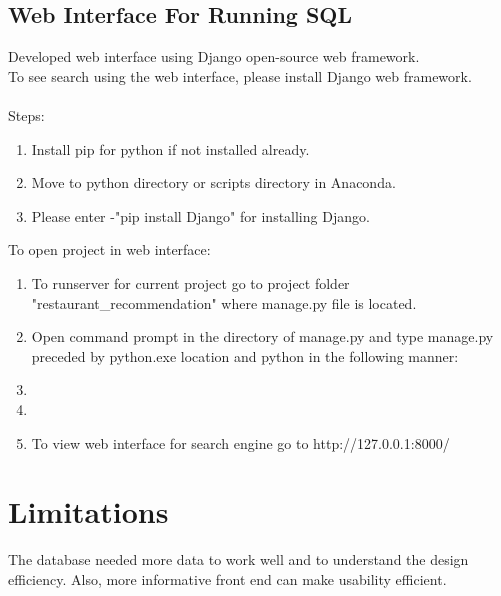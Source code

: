 \documentclass[12pt]{report}
\begin{document}
\subsection*{Web Interface For Running SQL}
Developed web interface using Django open-source web framework.\\
To see search using the web interface, please install Django web framework.\\\\
Steps: 
\begin{enumerate}
\item Install pip for python if not installed already.
\item Move to python directory or scripts directory in Anaconda.
\item Please enter  -"pip install Django" for installing Django.
\end{enumerate}
To open project in web interface:
\begin{enumerate}
\item To runserver for current project go to project folder "restaurant\_recommendation" where manage.py file is located.
\item Open command prompt in the directory of manage.py and type manage.py  preceded by python.exe location and python in the following manner:
\item {}
\item {}
\item To view web interface for search engine go to http://127.0.0.1:8000/
\end{enumerate}
\section*{Limitations}
The database needed more data to work well and to understand the design efficiency. Also, more informative front end can make usability efficient.
\end{document}
